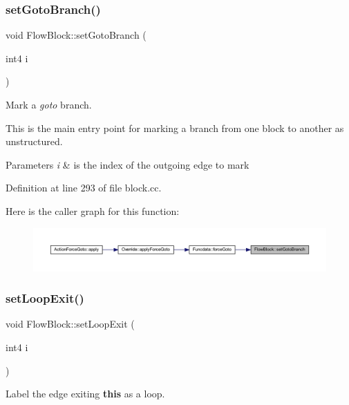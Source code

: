 \subsubsection{\texorpdfstring{setGotoBranch()}{setGotoBranch()}}
{\footnotesize\ttfamily void Flow\+Block\+::set\+Goto\+Branch (\begin{DoxyParamCaption}\item[{int4}]{i }\end{DoxyParamCaption})}



Mark a {\itshape goto} branch. 

This is the main entry point for marking a branch from one block to another as unstructured. 
\begin{DoxyParams}{Parameters}
{\em i} & is the index of the outgoing edge to mark \\
\hline
\end{DoxyParams}


Definition at line 293 of file block.\+cc.

Here is the caller graph for this function\+:
\nopagebreak
\begin{figure}[H]
\begin{center}
\leavevmode
\includegraphics[width=350pt]{class_flow_block_a50ac469ba63c50f574bf05f18a307f8c_icgraph}
\end{center}
\end{figure}
\mbox{\label{class_flow_block_a147b6b67590b45995925e08d6b77bd6e}} 
\subsubsection{\texorpdfstring{setLoopExit()}{setLoopExit()}}
{\footnotesize\ttfamily void Flow\+Block\+::set\+Loop\+Exit (\begin{DoxyParamCaption}\item[{int4}]{i }\end{DoxyParamCaption})\hspace{0.3cm}{\ttfamily [inline]}}



Label the edge exiting {\bfseries{this}} as a loop. 



